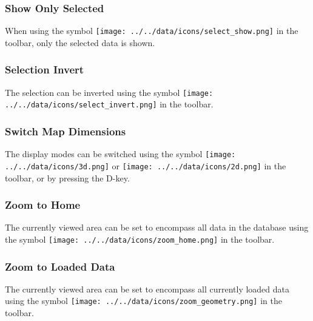 \subsubsection{Show Only Selected}

When using the symbol \texttt{[image: ../../data/icons/select\_show.png]} in the toolbar, only the selected data is shown.

\subsubsection{Selection Invert}

The selection can be inverted using the symbol \texttt{[image: ../../data/icons/select\_invert.png]} in the toolbar.

%
%
%

\subsubsection{Switch Map Dimensions}

The display modes can be switched using the symbol \texttt{[image: ../../data/icons/3d.png]} or \texttt{[image: ../../data/icons/2d.png]} in the toolbar, or by pressing the D-key. 

\subsubsection{Zoom to Home}

The currently viewed area can be set to encompass all data in the database using the symbol \texttt{[image: ../../data/icons/zoom\_home.png]} in the toolbar.

\subsubsection{Zoom to Loaded Data}

The currently viewed area can be set to encompass all currently loaded data using the symbol \texttt{[image: ../../data/icons/zoom\_geometry.png]} in the toolbar.

